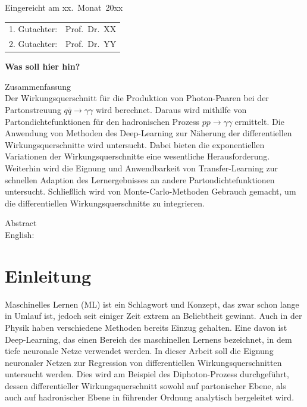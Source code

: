 \thispagestyle{empty}\vspace*{48em}

Eingereicht am xx.~Monat~20xx\vspace{1.5em}
\par{\large\begin{tabular}{ll}
 1. Gutachter: & Prof.~Dr.~XX \\
 2. Gutachter: & Prof.~Dr.~YY \\
\end{tabular}}


\newpage
\thispagestyle{empty}
\begin{center}\large\bfseries Was soll hier hin? \end{center}

Zusammenfassung \\
Der Wirkungsquerschnitt für die Produktion von Photon-Paaren bei der Partonstreuung $q\overline{q} \rightarrow \gamma \gamma$ wird berechnet. Daraus wird mithilfe von Partondichtefunktionen für den hadronischen Prozess $pp \rightarrow \gamma \gamma$ ermittelt. Die Anwendung von Methoden des Deep-Learning zur Näherung der differentiellen Wirkungsquerschnitte wird untersucht. Dabei bieten die exponentiellen Variationen der Wirkungsquerschnitte eine wesentliche Herausforderung.
Weiterhin wird die Eignung und Anwendbarkeit von Transfer-Learning zur schnellen Adaption des Lernergebnisses an andere Partondichtefunktionen untersucht. Schließlich wird von Monte-Carlo-Methoden Gebrauch gemacht, um die differentiellen Wirkungsquerschnitte zu integrieren.


\vspace{20em}
Abstract \\ 
English: \\
 
 

\cleardoublepage
\tableofcontents
\cleardoublepage




\chapter{Einleitung}
Maschinelles Lernen (ML) ist ein Schlagwort und Konzept, das zwar schon lange in Umlauf ist, jedoch seit einiger Zeit extrem an Beliebtheit gewinnt. Auch in der Physik haben verschiedene Methoden bereits Einzug gehalten. Eine davon ist Deep-Learning, das einen Bereich des maschinellen Lernens bezeichnet, in dem tiefe neuronale Netze verwendet werden. In dieser Arbeit soll die Eignung neuronaler Netzen zur Regression von differentiellen Wirkungsquerschnitten untersucht werden. Dies wird am Beispiel des Diphoton-Prozess durchgeführt, dessen differentieller Wirkungsquerschnitt sowohl auf partonischer Ebene, als auch auf hadronischer Ebene in führender Ordnung analytisch hergeleitet wird.

